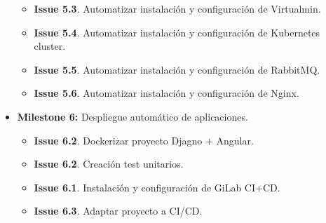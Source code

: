 \begin{text}
\begin{itemize}
\begin{itemize}
					\item \textbf{Issue 5.3}. Automatizar instalación y configuración de Virtualmin.
					\item \textbf{Issue 5.4}. Automatizar instalación y configuración de Kubernetes cluster.
					\item \textbf{Issue 5.5}. Automatizar instalación y configuración de RabbitMQ.
					\item \textbf{Issue 5.6}. Automatizar instalación y configuración de Nginx.
				\end{itemize}
			\item \textbf{Milestone 6:} Despliegue automático de aplicaciones.
				\begin{itemize}
					\item \textbf{Issue 6.2}. Dockerizar proyecto Djagno + Angular.
					\item \textbf{Issue 6.2}. Creación test unitarios.
					\item \textbf{Issue 6.1}. Instalación y configuración de GiLab CI+CD.
					\item \textbf{Issue 6.3}. Adaptar proyecto a CI/CD.
				\end{itemize}
		\end{itemize}
	\end{text}



		
